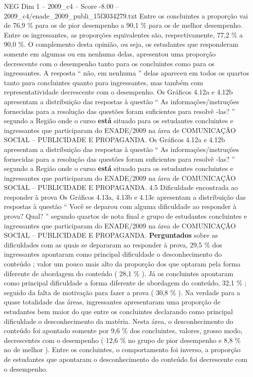 \begin{textsample}{NEG Dim 1 – 2009\_c4 – Score -8.00 – 2009\_c4/enade\_2009\_publi\_15f3034279.txt}
Entre os concluintes a proporção vai de 76,9 \% para os de pior desempenho a 90,1 \% para os de melhor desempenho.
Entre os ingressantes, as proporções equivalentes são, respectivamente, 77,2 \% a 90,0 \%.
O complemento desta opinião, ou seja, os estudantes que responderam somente em algumas ou em nenhuma delas, apresentou uma proporção decrescente com o desempenho tanto para os concluintes como para os ingressantes.
A resposta “ não, em nenhuma ” delas apareceu em todos os quartos tanto para concluintes quanto para ingressantes, mas também com representatividade decrescente com o desempenho.
Os Gráficos 4.12a e 4.12b apresentam a distribuição das respostas à questão “ As informações/instruções fornecidas para a resolução das questões foram suficientes para resolvê -las? ” segundo a Região onde o curso \textbf{está} situado para os estudantes concluintes e ingressantes que participaram do ENADE/2009 na área de COMUNICAÇÃO SOCIAL – PUBLICIDADE E PROPAGANDA.
Os Gráficos 4.12a e 4.12b apresentam a distribuição das respostas à questão “ As informações/instruções fornecidas para a resolução das questões foram suficientes para resolvê -las? ” segundo a Região onde o curso \textbf{está} situado para os estudantes concluintes e ingressantes que participaram do ENADE/2009 na área de COMUNICAÇÃO SOCIAL – PUBLICIDADE E PROPAGANDA. 4.5 Dificuldade encontrada ao responder à prova Os Gráficos 4.13a, 4.13b e 4.13c apresentam a distribuição das respostas à questão “ Você se deparou com alguma dificuldade ao responder à prova?
Qual? ” segundo quartos de nota final e grupo de estudantes concluintes e ingressantes que participaram do ENADE/2009 na área de COMUNICAÇÃO SOCIAL – PUBLICIDADE E PROPAGANDA. \textbf{Perguntados} sobre as dificuldades com as quais se depararam ao responder à prova, 29,5 \% dos ingressantes apontaram como principal dificuldade o desconhecimento do conteúdo ; valor um pouco mais alto da proporção dos que optaram pela forma diferente de abordagem do conteúdo ( 28,1 \% ).
Já os concluintes apontaram como principal dificuldade a forma diferente de abordagem do conteúdo, 32,1 \% ; seguido da falta de motivação para fazer a prova ( 30,8 \% ).
Na verdade para a quase totalidade das áreas, ingressantes apresentaram uma proporção de estudantes bem maior do que entre os concluintes declarando como principal dificuldade o desconhecimento da matéria.
Nesta área, o desconhecimento do conteúdo foi apontado somente por 9,6 \% dos concluintes, valores, grosso modo, decrescentes com o desempenho ( 12,6 \% no grupo de pior desempenho e 8,8 \% no de melhor ).
Entre os concluintes, o comportamento foi inverso, a proporção de estudantes que apontaram o desconhecimento do conteúdo foi decrescente com o desempenho.

\end{textsample}
